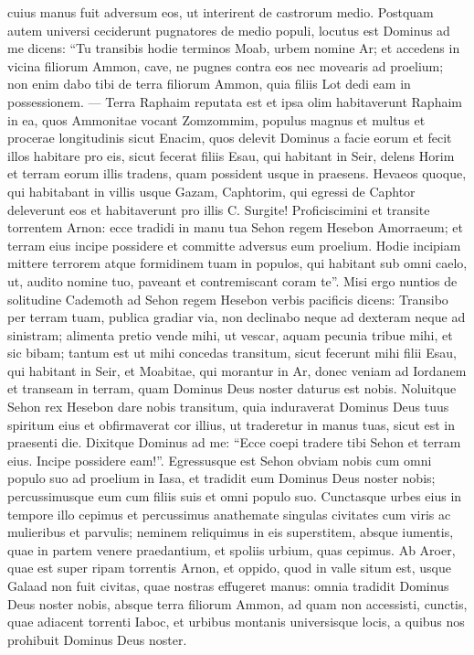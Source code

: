 \begin{biblechapter}
\begin{biblechapter}
\verse cuius manus fuit adversum eos, ut interirent de castrorum medio.
 \verse Postquam autem universi ceciderunt pugnatores de medio populi, 
\verse locutus est Dominus ad me dicens: 
\verse “Tu transibis hodie terminos Moab, urbem nomine Ar; 
\verse et accedens in vicina filiorum Ammon, cave, ne pugnes contra eos nec movearis ad proelium; non enim dabo tibi de terra filiorum Ammon, quia filiis Lot dedi eam in possessionem. 
\verse — Terra Raphaim reputata est et ipsa olim habitaverunt Raphaim in ea, quos Ammonitae vocant Zomzommim, 
\verse populus magnus et multus et procerae longitudinis sicut Enacim, quos delevit Dominus a facie eorum et fecit illos habitare pro eis, 
\verse sicut fecerat filiis Esau, qui habitant in Seir, delens Horim et terram eorum illis tradens, quam possident usque in praesens. 
\verse Hevaeos quoque, qui habitabant in villis usque Gazam, Caphtorim, qui egressi de Caphtor deleverunt eos et habitaverunt pro illis C. 
 \verse Surgite! Proficiscimini et transite torrentem Arnon: ecce tradidi in manu tua Sehon regem Hesebon Amorraeum; et terram eius incipe possidere et committe adversus eum proelium. 
\verse Hodie incipiam mittere terrorem atque formidinem tuam in populos, qui habitant sub omni caelo, ut, audito nomine tuo, paveant et contremiscant coram te”.
 \verse Misi ergo nuntios de solitudine Cademoth ad Sehon regem Hesebon verbis pacificis dicens: 
\verse Transibo per terram tuam, publica gradiar via, non declinabo neque ad dexteram neque ad sinistram; 
\verse alimenta pretio vende mihi, ut vescar, aquam pecunia tribue mihi, et sic bibam; tantum est ut mihi concedas transitum, 
\verse sicut fecerunt mihi filii Esau, qui habitant in Seir, et Moabitae, qui morantur in Ar, donec veniam ad Iordanem et transeam in terram, quam Dominus Deus noster daturus est nobis.
 \verse Noluitque Sehon rex Hesebon dare nobis transitum, quia induraverat Dominus Deus tuus spiritum eius et obfirmaverat cor illius, ut traderetur in manus tuas, sicut est in praesenti die. 
\verse Dixitque Dominus ad me: “Ecce coepi tradere tibi Sehon et terram eius. Incipe possidere eam!”.
 \verse Egressusque est Sehon obviam nobis cum omni populo suo ad proelium in Iasa, 
\verse et tradidit eum Dominus Deus noster nobis; percussimusque eum cum filiis suis et omni populo suo. 
\verse Cunctasque urbes eius in tempore illo cepimus et percussimus anathemate singulas civitates cum viris ac mulieribus et parvulis; neminem reliquimus in eis superstitem, 
\verse absque iumentis, quae in partem venere praedantium, et spoliis urbium, quas cepimus. 
\verse Ab Aroer, quae est super ripam torrentis Arnon, et oppido, quod in valle situm est, usque Galaad non fuit civitas, quae nostras effugeret manus: omnia tradidit Dominus Deus noster nobis, 
\verse absque terra filiorum Ammon, ad quam non accessisti, cunctis, quae adiacent torrenti Iaboc, et urbibus montanis universisque locis, a quibus nos prohibuit Dominus Deus noster.
 

\end{biblechapter}
\end{biblechapter}
